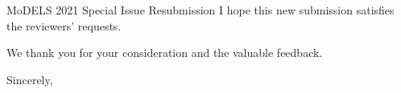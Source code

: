 \documentclass[10pt]{byu-cs}
\begin{document}
\begin{letter}{MoDELS 2021 Special Issue Resubmission}
I hope this new submission satisfies the reviewers' requests.

We thank you for your consideration and the valuable feedback.

\closing{Sincerely,}

\end{letter}
\end{document}
